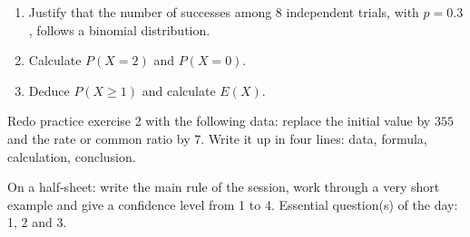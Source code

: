 \begin{exercice}[-- essential]
\begin{enumerate}\item Justify that the number of successes among $8$ independent trials, with $p=0.3$, follows a binomial distribution.\item Calculate $P(X=2)$ and $P(X=0)$.\item Deduce $P(X\geq1)$ and calculate $E(X)$.\end{enumerate}
\end{exercice}


\begin{dm}Redo practice exercise 2 with the following data: replace the initial value by $355$ and the rate or common ratio by $7$. Write it up in four lines: data, formula, calculation, conclusion.\end{dm}

\begin{sortie}On a half-sheet: write the main rule of the session, work through a very short example and give a confidence level from 1 to 4. Essential question(s) of the day: 1, 2 and 3.\end{sortie}

